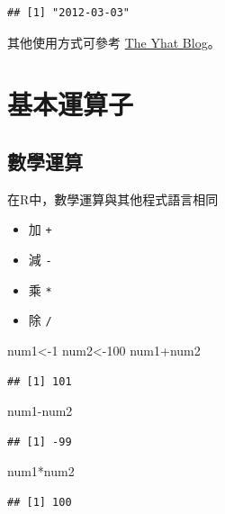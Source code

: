 \documentclass[]{book}
\newenvironment{Shaded}{\begin{snugshade}}{\end{snugshade}}
\newcommand{\DecValTok}[1]{\textcolor[rgb]{0.00,0.00,0.81}{{#1}}}
\newcommand{\NormalTok}[1]{{#1}}
\providecommand{\tightlist}{%
  \setlength{\itemsep}{0pt}\setlength{\parskip}{0pt}}
\theoremstyle{definition}
\theoremstyle{definition}
\theoremstyle{remark}
\begin{document}
\begin{verbatim}
## [1] "2012-03-03"
\end{verbatim}

其他使用方式可參考
\href{http://blog.yhat.com/static/pdf/R_date_cheat_sheet.pdf}{The Yhat
Blog}。

\section{基本運算子}

\subsection{數學運算}

在R中，數學運算與其他程式語言相同

\begin{itemize}
\tightlist
\item
  加 \texttt{+}
\item
  減 \texttt{-}
\item
  乘 \texttt{*}
\item
  除 \texttt{/}
\end{itemize}

\begin{Shaded}
\begin{Highlighting}[]
\NormalTok{num1<-}\DecValTok{1}
\NormalTok{num2<-}\DecValTok{100}
\NormalTok{num1+num2}
\end{Highlighting}
\end{Shaded}

\begin{verbatim}
## [1] 101
\end{verbatim}

\begin{Shaded}
\begin{Highlighting}[]
\NormalTok{num1-num2}
\end{Highlighting}
\end{Shaded}

\begin{verbatim}
## [1] -99
\end{verbatim}

\begin{Shaded}
\begin{Highlighting}[]
\NormalTok{num1*num2}
\end{Highlighting}
\end{Shaded}

\begin{verbatim}
## [1] 100
\end{verbatim}
\end{document}
